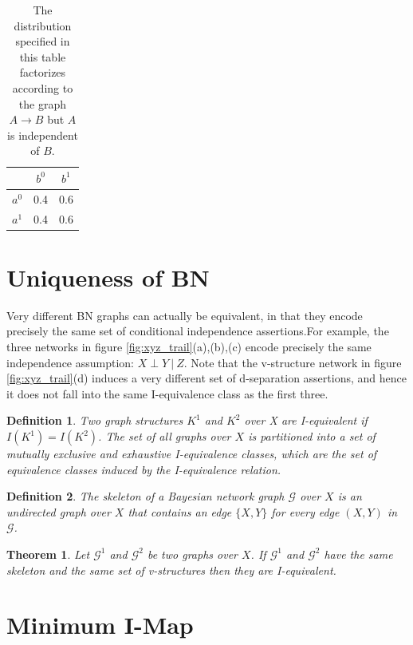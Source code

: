 \documentclass[twoside]{article}
\newtheorem{thm}{Theorem}[section]
\newtheorem{Defn}{Definition}[section]
\begin{document}
\begin{table}[!hbt]
\centering
\begin{tabular}{c|cc}
 & \(b^0\) & \(b^1\)\\ \hline
\(a^0\) & 0.4 & 0.6\\
\(a^1\) & 0.4 & 0.6\\
\end{tabular}
\caption{\label{table:completeness} The distribution specified in this table factorizes according to the graph \(A \rightarrow B\) but \(A\) is independent of \(B\).}
\end{table}

\section{Uniqueness of BN}
Very different BN graphs can actually be equivalent, in that they encode precisely the same set of conditional independence assertions.For example, the three networks in figure \ref{fig:xyz_trail}(a),(b),(c) encode precisely the same independence assumption: \(X\perp Y\ |\ Z\). Note that the v-structure network in figure \ref{fig:xyz_trail}(d) induces a very different set of d-separation assertions, and hence it does not fall into the same I-equivalence class as the first three.

\begin{Defn}
Two graph structures \(K^1\) and \(K^2\) over X are I-equivalent if \(I(K^1) = I(K^2)\). The set of all graphs over \(X\) is partitioned into a set of mutually exclusive and exhaustive I-equivalence classes, which are the set of equivalence classes induced by the I-equivalence relation.\(\)
\end{Defn}

\begin{Defn}
The skeleton of a Bayesian network graph \(\mathcal{G}\) over \(X\) is an undirected graph over \(X\) that contains an edge \(\{X, Y\}\) for every edge \((X, Y)\) in \(\mathcal{G}\).
\end{Defn}

\begin{thm}
Let \(\mathcal{G}^1\) and \(\mathcal{G}^2\) be two graphs over \(X\). If \(\mathcal{G}^1\) and \(\mathcal{G}^2\) have the same skeleton and the same set of v-structures then they are I-equivalent.
\end{thm}

\section{Minimum I-Map}
\end{document}
